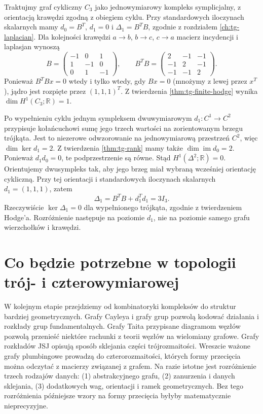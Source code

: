 \begin{przyklad}
Traktujmy graf cykliczny $C_3$ jako jednowymiarowy
kompleks symplicjalny, z orientacją krawędzi zgodną
z obiegiem cyklu. Przy standardowych iloczynach skalarnych
mamy $d_0=B^T$, $d_1=0$ i $\Delta_1=B^TB$,
zgodnie z rozdziałem \ref{ch:tg-laplacian}.
Dla kolejności krawędzi $a\to b$, $b\to c$,
$c\to a$ macierz incydencji i laplasjan wynoszą
\[
 B=\begin{pmatrix}-1&0&1\\1&-1&0\\0&1&-1\end{pmatrix},
 \qquad B^TB=\begin{pmatrix}2&-1&-1\\-1&2&-1\\-1&-1&2\end{pmatrix}.
\]
Ponieważ $B^TBx=0$ wtedy i tylko wtedy, gdy
$Bx=0$ (mnożymy z lewej przez $x^T$),
jądro jest rozpięte przez $(1,1,1)^T$.
Z twierdzenia \ref{thm:tg-finite-hodge} wynika
$\dim H^1(C_3;\mathbb R)=1$.

Po wypełnieniu cyklu jednym sympleksem dwuwymiarowym
$d_1:C^1\to C^2$ przypisuje kołańcuchowi sumę jego
trzech wartości na zorientowanym brzegu trójkąta.
Jest to niezerowe odwzorowanie na jednowymiarową
przestrzeń $C^2$, więc $\dim\ker d_1=2$.
Z twierdzenia \ref{thm:tg-rank} mamy także
$\dim\operatorname{im}d_0=2$.
Ponieważ $d_1d_0=0$, te podprzestrzenie są równe.
Stąd $H^1(\Delta^2;\mathbb R)=0$.
Orientujemy dwusympleks tak, aby jego brzeg
miał wybraną wcześniej orientację cykliczną.
Przy tej orientacji i standardowych
iloczynach skalarnych $d_1=(1,1,1)$, zatem
\[
 \Delta_1=B^TB+d_1^Td_1=3I_3.
\]
Rzeczywiście $\ker\Delta_1=0$ dla wypełnionego
trójkąta, zgodnie z twierdzeniem Hodge'a.
Rozróżnienie następuje na poziomie $d_1$,
nie na poziomie samego grafu wierzchołków i krawędzi.
\end{przyklad}

\section{Co będzie potrzebne w topologii trój- i czterowymiarowej}
\label{sec:tg-roadmap-topology}

\begin{uwaga}
W kolejnym etapie przejdziemy od kombinatoryki
kompleksów do struktur bardziej geometrycznych.
Grafy Cayleya i grafy grup pozwolą kodować działania
i rozkłady grup fundamentalnych. Grafy Taita
przypisane diagramom węzłów pozwolą przenieść
niektóre rachunki z teorii węzłów na wielomiany grafowe.
Grafy rozkładów JSJ opisują sposób sklejania części
trójrozmaitości. Wreszcie ważone grafy plumbingowe
prowadzą do czterorozmaitości, których formy przecięcia
można odczytać z macierzy związanej z grafem.
Na razie istotne jest rozróżnienie trzech rodzajów danych:
(1) abstrakcyjnego grafu, (2) zanurzenia i danych sklejania,
(3) dodatkowych wag, orientacji i ramek geometrycznych.
Bez tego rozróżnienia późniejsze wzory na formy przecięcia
byłyby matematycznie nieprecyzyjne.
\end{uwaga}

